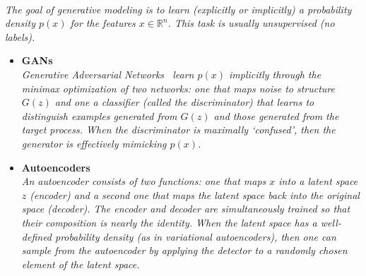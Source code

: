 \documentclass[12pt,letterpaper]{article}
\begin{document}
\begin{itemize}
\\\textit{The goal of generative modeling is to learn (explicitly or implicitly) a probability density $p(x)$ for the features $x\in\mathbb{R}^n$.  This task is usually unsupervised (no labels).}
	\begin{itemize}
		\item \textbf{GANs}~\cite{deOliveira:2017pjk,Paganini:2017hrr,Paganini:2017dwg,Alonso-Monsalve:2018aqs,Butter:2019eyo,Martinez:2019jlu,Bellagente:2019uyp,Vallecorsa:2019ked,SHiP:2019gcl,Carrazza:2019cnt,Butter:2019cae,Lin:2019htn,DiSipio:2019imz,Hashemi:2019fkn,Chekalina:2018hxi,ATL-SOFT-PUB-2018-001,Zhou:2018ill,Carminati:2018khv,Vallecorsa:2018zco,Datta:2018mwd,Musella:2018rdi,Erdmann:2018kuh,Deja:2019vcv,Derkach:2019qfk,Erbin:2018csv,Erdmann:2018jxd,Urban:2018tqv,Oliveira:DLPS2017,deOliveira:2017rwa,Farrell:2019fsm,Hooberman:DLPS2017,Belayneh:2019vyx,Wang:2020tap,buhmann2020getting,Alanazi:2020jod,2009.03796,2008.06545,Kansal:2020svm,Maevskiy:2020ank,Lai:2020byl,Choi:2021sku,Rehm:2021zow,Rehm:2021zoz,Carrazza:2021hny,Rehm:2021qwm,Lebese:2021foi,Winterhalder:2021ave,Kansal:2021cqp,NEURIPS2020_a878dbeb,Khattak:2021ndw,Mu:2021nno,Li:2021cbp,Bravo-Prieto:2021ehz,Anderlini:2021qpm,Chisholm:2021pdn,Desai:2021wbb,Buhmann:2021caf,Bieringer:2022cbs,Ghosh:2022zdz,Anderlini:2022ckd,Ratnikov:2022hge,Rogachev:2022hjg,ATLAS:2022jhk,Anderlini:2022hgm,Buhmann:2023pmh,Yue:2023uva,Hashemi:2023ruu,EXO:2023pkl,Diefenbacher:2023prl,Chan:2023ume,Dubinski:2023fsy,Alghamdi:2023emm,Barbetti:2023bvi,Erdmann:2023ngr,FaucciGiannelli:2023fow}
		\\\textit{Generative Adversarial Networks~\cite{Goodfellow:2014upx} learn $p(x)$ implicitly through the minimax optimization of two networks: one that maps noise to structure $G(z)$ and one a classifier (called the discriminator) that learns to distinguish examples generated from $G(z)$ and those generated from the target process.  When the discriminator is maximally `confused', then the generator is effectively mimicking $p(x)$.}
		\item \textbf{Autoencoders}~\cite{Monk:2018zsb,ATL-SOFT-PUB-2018-001,Cheng:2020dal,1816035,Howard:2021pos,Buhmann:2021lxj,Bortolato:2021zic,deja2020endtoend,Hariri:2021clz,Fanelli:2019qaq,Collins:2021pld,Orzari:2021suh,Jawahar:2021vyu,Tsan:2021brw,Buhmann:2021caf,Touranakou:2022qrp,Ilten:2022jfm,Collins:2022qpr,AbhishekAbhishek:2022wby,Cresswell:2022tof,Roche:2023int,Anzalone:2023ugq,Lasseri:2023dhi,Chekanov:2023uot}
		\\\textit{An autoencoder consists of two functions: one that maps $x$ into a latent space $z$ (encoder) and a second one that maps the latent space back into the original space (decoder).  The encoder and decoder are simultaneously trained so that their composition is nearly the identity.  When the latent space has a well-defined probability density (as in variational autoencoders), then one can sample from the autoencoder by applying the detector to a randomly chosen element of the latent space.}

\end{itemize}
\end{itemize}
\end{document}
